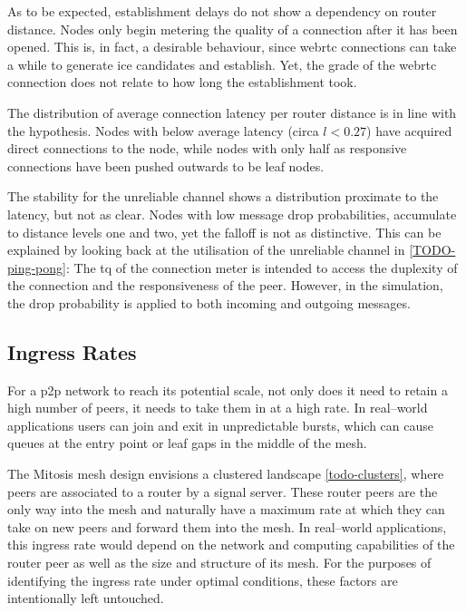 As to be expected, establishment delays do not show a dependency on router distance. Nodes only begin metering the quality of a connection after it has been opened. This is, in fact, a desirable behaviour, since \gls{webrtc} connections can take a while to generate \gls{ice} candidates and establish. Yet, the grade of the \gls{webrtc} connection does not relate to how long the establishment took.

The distribution of average connection latency per router distance is in line with the hypothesis. Nodes with below average latency (circa $l<0.27$) have acquired direct connections to the \router node, while nodes with only half as responsive connections have been pushed outwards to be leaf nodes.

The stability for the unreliable channel shows a distribution proximate to the latency, but not as clear. Nodes with low message drop probabilities, accumulate to distance levels one and two, yet the falloff is not as distinctive. This can be explained by looking back at the utilisation of the unreliable channel in \vref{TODO-ping-pong}: The \gls{tq} of the connection meter is intended to access the duplexity of the connection and the responsiveness of the peer. However, in the simulation, the drop probability is applied to both incoming and outgoing messages.

\subsection{Ingress Rates}

For a \gls{p2p} network to reach its potential scale, not only does it need to retain a high number of peers, it needs to take them in at a high rate. In real–world applications users can join and exit in unpredictable bursts, which can cause queues at the entry point or leaf gaps in the middle of the mesh.

The Mitosis mesh design envisions a clustered landscape \vref{todo-clusters}, where peers are associated to a router by a signal server. These router peers are the only way into the mesh and naturally have a maximum rate at which they can take on new peers and forward them into the mesh. In real–world applications, this ingress rate would depend on the network and computing capabilities of the router peer as well as the size and structure of its mesh. For the purposes of identifying the ingress rate under optimal conditions, these factors are intentionally left untouched.

